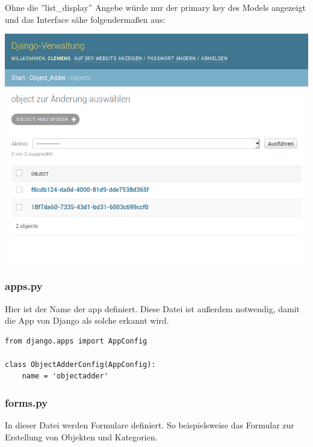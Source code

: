 \documentclass{article}
\begin{document}
Ohne die ''list\_display'' Angebe würde nur der primary key des Models angezeigt und das Interface sähe folgendermaßen aus:
\newline
\begin{center}
	\includegraphics[width=\linewidth]{django_admin_obj_pk.png}
\end{center}
\subsubsection{apps.py}
Hier ist der Name der app definiert. Diese Datei ist außerdem notwendig, damit die App von Django als solche erkannt wird.
\begin{verbatim}
from django.apps import AppConfig

class ObjectAdderConfig(AppConfig):
	name = 'objectadder'
\end{verbatim}
\subsubsection{forms.py}
In dieser Datei werden Formulare definiert. So beispielsweise das Formular zur Erstellung von Objekten und Kategorien. 
\end{document}
